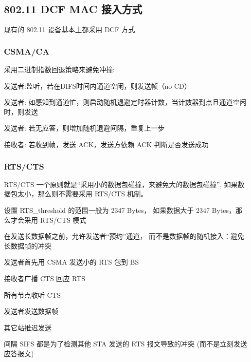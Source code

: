 \documentclass[UTF8,cs4size]{ctexart}
\begin{document}
\subsection{802.11 DCF MAC 接入方式}
现有的 802.11 设备基本上都采用 DCF 方式
\subsubsection{CSMA/CA}
采用二进制指数回退策略来避免冲撞:
\begin{compactitem}
  \item 发送者:监听，若在DIFS时间内通道空闲，则发送帧（no CD）
  \item 发送者: 如感知到通道忙，则启动随机退避定时器计数，当计数器到点且通道空闲时，则发送
  \item 发送者: 若无应答，则增加随机退避间隔，重复上一步
  \item 接收者: 若收到帧，发送 ACK，发送方依赖 ACK 判断是否发送成功
\end{compactitem}
\subsubsection{RTS/CTS}
RTS/CTS 一个原则就是``采用小的数据包碰撞，来避免大的数据包碰撞'',
如果数据包太小，那么则不需要采用 RTS/CTS 机制。

设置 RTS\_threshold 的范围一般为 2347 Bytes，
如果数据大于 2347 Bytes，那么才会采用 RTS/CTS 模式

在发送长数据帧之前，允许发送者“预约”通道，
而不是数据帧的随机接入：避免长数据帧的冲突
\begin{compactitem}
  \item 发送者首先用 CSMA 发送小的 RTS 包到 BS
  \item 接收者广播 CTS 回应 RTS
  \item 所有节点收听 CTS
  \item 发送者发送数据帧
  \item 其它站推迟发送
  \item 间隔 SIFS 都是为了检测其他 STA 发送的 RTS 报文导致的冲突 (而不是立刻发送应答报文)
\end{compactitem}
\end{document}
